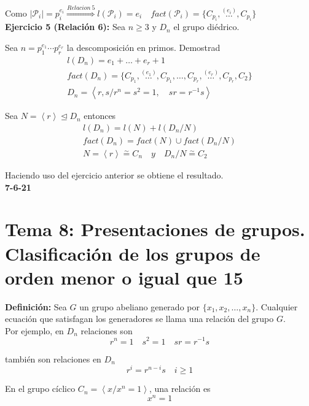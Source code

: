 \documentclass{article}
\begin{document}
Como $|\mathcal{P}_i|=p_i^{e_i}\overset{Relacion\:5}{\Rightarrow} l(\mathcal{P}_i)=e_i\quad fact(\mathcal{P}_i)=\{C_{p_i},\overset{(e_i)}{\ldots}, C_{p_i}\}$ \\

\textbf{Ejercicio 5 (Relación 6):} Sea $n\geq 3$ y $D_n$ el grupo diédrico.

Sea $n=p_1^{e_1}\cdots p_r^{e_r}$ la descomposición en primos. Demostrad
\begin{gather*}
l(D_n)=e_1+\ldots+e_r+1\\
fact(D_n)=\{C_{p_1},\overset{(e_1)}{\ldots},C_{p_1},\ldots,C_{p_r},\overset{(e_r)}{\ldots}, C_{p_r}, C_2\}\\
D_n=\left\langle r,s/r^n=s^2=1,\quad sr=r^{-1}s\right\rangle
\end{gather*}

Sea $N=\left\langle r\right\rangle \unlhd D_n$ entonces
\begin{gather*}
l(D_n)=l(N)+l(D_n/N) \\
fact(D_n)=fact(N)\cup fact(D_n/N)\\
N=\left\langle r \right\rangle \overset{\sim}{=} C_n \quad y\quad D_n/N\overset{\sim}{=} C_2
\end{gather*}

Haciendo uso del ejercicio anterior se obtiene el resultado. \\

\textbf{7-6-21}

\section{Tema 8: Presentaciones de grupos. Clasificación de los grupos de orden menor o igual que 15}

\textbf{Definición:} Sea $G$ un grupo abeliano generado por $\{x_1,x_2,\ldots,x_n\}$. Cualquier ecuación que satisfagan los generadores se llama una relación del grupo $G$. \\

Por ejemplo, en $D_n$ relaciones son 
\begin{equation*}
r^n=1\quad s^2=1\quad sr=r^{-1}s 
\end{equation*}

también son relaciones en $D_n$
\begin{equation*}
r^i=r^{n-i}s\quad i\geq 1
\end{equation*}

En el grupo cíclico $C_n=\left\langle x/x^n=1\right\rangle$, una relación es
\begin{equation*}
x^n=1
\end{equation*}
\end{document}
